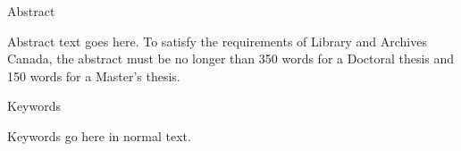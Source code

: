 \begin{center} \Large Abstract \end{center}

Abstract text goes here.
To satisfy the requirements of Library and Archives Canada, the abstract must be no longer than 350 words for a Doctoral thesis and 150 words for a Master's thesis.

{\Large Keywords}

Keywords go here in normal text.